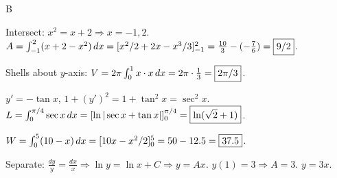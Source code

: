 \documentclass[11pt]{article}
\begin{document}
\begin{answers}{B}
\item Intersect: $x^2 = x + 2 \Rightarrow x = -1, 2$. $A = \int_{-1}^{2} (x + 2 - x^2) \,dx = [x^2/2 + 2x - x^3/3]_{-1}^2 = \tfrac{10}{3} - (-\tfrac{7}{6}) = \boxed{9/2}$.
\item Shells about $y$-axis: $V = 2\pi \int_0^1 x \cdot x \,dx = 2\pi \cdot \tfrac{1}{3} = \boxed{2\pi/3}$.
\item $y' = -\tan x$, $1 + (y')^2 = 1 + \tan^2 x = \sec^2 x$. $L = \int_0^{\pi/4} \sec x \,dx = [\ln|\sec x + \tan x|]_0^{\pi/4} = \boxed{\ln(\sqrt 2 + 1)}$.
\item $W = \int_0^5 (10 - x) \,dx = [10x - x^2/2]_0^5 = 50 - 12.5 = \boxed{37.5}$.
\item Separate: $\tfrac{dy}{y} = \tfrac{dx}{x} \Rightarrow \ln y = \ln x + C \Rightarrow y = A x$. $y(1) = 3 \Rightarrow A = 3$. $\boxed{y = 3x}$.
\end{answers}
\end{document}
